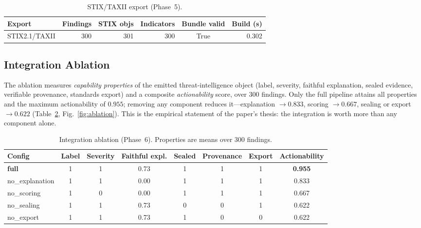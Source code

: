 \documentclass[11pt,a4paper]{article}
\begin{document}
\begin{table}[h]
\centering
\caption{STIX/TAXII export (Phase~5).}
\label{tab:r-stix}
\small
\begin{tabular}{@{}lrrrcr@{}}
\toprule
\textbf{Export} & \textbf{Findings} & \textbf{STIX objs} & \textbf{Indicators} & \textbf{Bundle valid} & \textbf{Build (s)} \\
\midrule
STIX2.1/TAXII & 300 & 301 & 300 & True & 0.302 \\
\bottomrule
\end{tabular}
\end{table}

\subsection{Integration Ablation}\label{sec:r-abl}
The ablation measures \emph{capability properties} of the emitted threat-intelligence
object (label, severity, faithful explanation, sealed evidence, verifiable provenance,
standards export) and a composite \emph{actionability} score, over $300$ findings.
Only the full pipeline attains all properties and the maximum actionability of $0.955$;
removing any component reduces it---explanation $\rightarrow 0.833$, scoring
$\rightarrow 0.667$, sealing or export $\rightarrow 0.622$ (Table~\ref{tab:r-abl},
Fig.~\ref{fig:ablation}). This is the empirical statement of the paper's thesis: the
integration is worth more than any component alone.

\begin{table}[h]
\centering
\caption{Integration ablation (Phase~6). Properties are means over 300 findings.}
\label{tab:r-abl}
\small
\begin{tabular}{@{}lcccccc c@{}}
\toprule
\textbf{Config} & \textbf{Label} & \textbf{Severity} & \textbf{Faithful expl.} & \textbf{Sealed} & \textbf{Provenance} & \textbf{Export} & \textbf{Actionability} \\
\midrule
\textbf{full}    & 1 & 1 & 0.73 & 1 & 1 & 1 & \textbf{0.955} \\
no\_explanation  & 1 & 1 & 0.00 & 1 & 1 & 1 & 0.833 \\
no\_scoring      & 1 & 0 & 0.00 & 1 & 1 & 1 & 0.667 \\
no\_sealing      & 1 & 1 & 0.73 & 0 & 0 & 1 & 0.622 \\
no\_export       & 1 & 1 & 0.73 & 1 & 0 & 0 & 0.622 \\
\bottomrule
\end{tabular}
\end{table}
\end{document}
